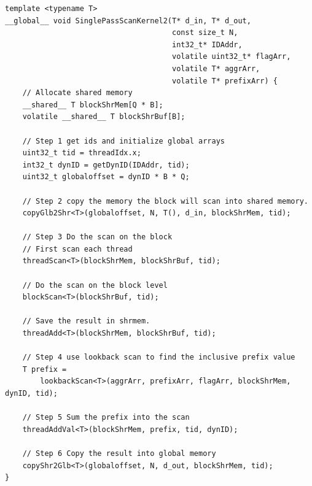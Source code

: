\documentclass[twocolumn]{article}
\begin{document}
\begin{lstlisting}[caption=Lookback kernel,label=lst:lookbackKernel]
template <typename T>
__global__ void SinglePassScanKernel2(T* d_in, T* d_out,
                                      const size_t N,
                                      int32_t* IDAddr,
                                      volatile uint32_t* flagArr,
                                      volatile T* aggrArr,
                                      volatile T* prefixArr) {
    // Allocate shared memory
    __shared__ T blockShrMem[Q * B];
    volatile __shared__ T blockShrBuf[B];

    // Step 1 get ids and initialize global arrays
    uint32_t tid = threadIdx.x;
    int32_t dynID = getDynID(IDAddr, tid);
    uint32_t globaloffset = dynID * B * Q;

    // Step 2 copy the memory the block will scan into shared memory.
    copyGlb2Shr<T>(globaloffset, N, T(), d_in, blockShrMem, tid);

    // Step 3 Do the scan on the block
    // First scan each thread
    threadScan<T>(blockShrMem, blockShrBuf, tid);

    // Do the scan on the block level
    blockScan<T>(blockShrBuf, tid);

    // Save the result in shrmem.
    threadAdd<T>(blockShrMem, blockShrBuf, tid);

    // Step 4 use lookback scan to find the inclusive prefix value
    T prefix =
        lookbackScan<T>(aggrArr, prefixArr, flagArr, blockShrMem, dynID, tid);

    // Step 5 Sum the prefix into the scan
    threadAddVal<T>(blockShrMem, prefix, tid, dynID);

    // Step 6 Copy the result into global memory
    copyShr2Glb<T>(globaloffset, N, d_out, blockShrMem, tid);
}
\end{lstlisting}

\newpage
\end{document}
